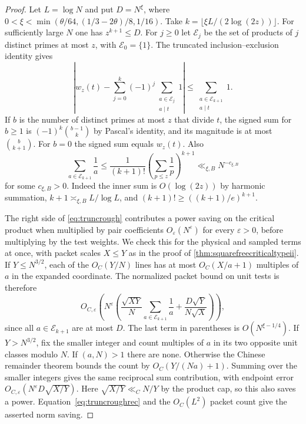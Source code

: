 \documentclass[11pt,a4paper]{article}
\numberwithin{equation}{section}
\begin{document}
\begin{proof}
Let $L=\log N$ and put $D=N^\xi$, where
$0<\xi<\min(\theta/64,(1/3-2\theta)/8,1/16)$.
Take $k=\lfloor \xi L/(2\log(2z))\rfloor$.
For sufficiently large $N$ one has $z^{k+1}\le D$.
For $j\ge0$ let $\mathcal E_j$ be the set of products of
$j$ distinct primes at most $z$, with $\mathcal E_0=\{1\}$.
The truncated inclusion--exclusion identity gives
\begin{equation}
 \left|w_z(t)-\sum_{j=0}^{k}(-1)^j
                        \sum_{\substack{a\in\mathcal E_j\\a\mid t}}1\right|
       \le \sum_{\substack{a\in\mathcal E_{k+1}\\a\mid t}}1 .
 \label{eq:truncrough}
\end{equation}
If $b$ is the number of distinct primes at most $z$ that divide
$t$, the signed sum for $b\ge1$ is $(-1)^k\binom{b-1}{k}$
by Pascal's identity, and its magnitude is at most
$\binom{b}{k+1}$. For $b=0$ the signed sum equals $w_z(t)$.
Also
\begin{equation}
 \sum_{a\in\mathcal E_{k+1}}\frac{1}{a}
    \le \frac{1}{(k+1)!}
               \left(\sum_{p\le z}\frac1p\right)^{k+1}
    \ll_{\xi,B} N^{-c_{\xi,B}}
 \label{eq:truncroughrec}
\end{equation}
for some $c_{\xi,B}>0$. Indeed the inner sum is
$O(\log(2z))$ by harmonic summation,
$k+1\asymp_{\xi,B}L/\log L$, and
$(k+1)!\ge((k+1)/e)^{k+1}$.

The right side of \cref{eq:truncrough} contributes a power
saving on the critical product when multiplied by pair
coefficients $O_\varepsilon(N^\varepsilon)$ for every
$\varepsilon>0$, before multiplying by the test weights.
We check this for the physical and sampled terms at once,
with packet scales $X\le Y$ as in the proof of
\cref{thm:squarefreecriticaltypeii}. If $Y\le N^{3/2}$,
each of the $O_C(Y/N)$ lines has at most $O_C(X/a+1)$
multiples of $a$ in the expanded coordinate. The normalized
packet bound on unit tests is therefore
\[
 O_{C,\varepsilon}\left(N^\varepsilon
  \left(\frac{\sqrt{XY}}N\sum_{a\in\mathcal E_{k+1}}\frac1a
                         +\frac{D\sqrt Y}{N\sqrt X}\right)\right),
\]
since all $a\in\mathcal E_{k+1}$ are at most $D$.
The last term in parentheses is $O(N^{\xi-1/4})$.
If $Y>N^{3/2}$, fix the smaller integer and count
multiples of $a$ in its two opposite unit classes modulo
$N$. If $(a,N)>1$ there are none. Otherwise the Chinese
remainder theorem bounds the count by $O_C(Y/(Na)+1)$.
Summing over the smaller integers gives the same reciprocal
sum contribution, with endpoint error
$O_{C,\varepsilon}(N^\varepsilon D\sqrt{X/Y})$.
Here $\sqrt{X/Y}\ll_C N/Y$ by the product cap, so this
also saves a power. Equation~\eqref{eq:truncroughrec} and
the $O_C(L^2)$ packet count give the asserted norm saving.


\end{proof}
\end{document}
